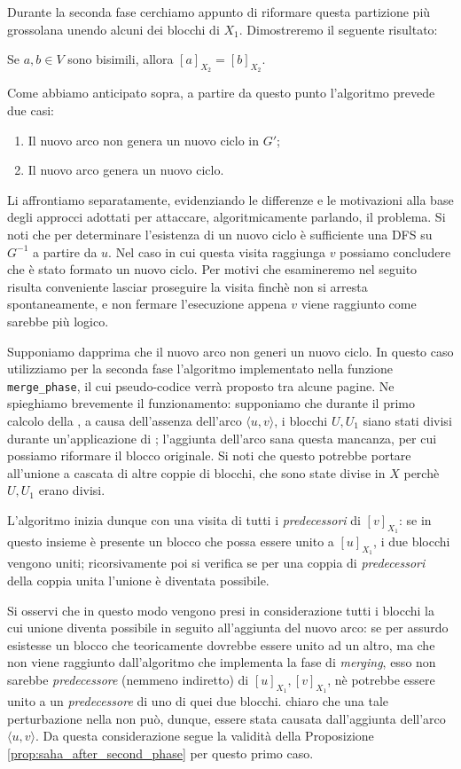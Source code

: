 Durante la seconda fase cerchiamo appunto di riformare questa partizione più grossolana unendo alcuni dei blocchi di $X_1$. Dimostreremo il seguente risultato:
\begin{proposition}
    \label{prop:saha_after_second_phase}
    Se $a,b \in V$ sono bisimili, allora $[a]_{X_2} = [b]_{X_2}$.
\end{proposition}

Come abbiamo anticipato sopra, a partire da questo punto l'algoritmo prevede due casi:
\begin{enumerate}
    \item Il nuovo arco non genera un nuovo ciclo in $G'$;
    \item Il nuovo arco genera un nuovo ciclo.
\end{enumerate}
Li affrontiamo separatamente, evidenziando le differenze e le motivazioni alla base degli approcci adottati per attaccare, algoritmicamente parlando, il problema. Si noti che per determinare l'esistenza di un nuovo ciclo è sufficiente una DFS su $G^{-1}$ a partire da $u$. Nel caso in cui questa visita raggiunga $v$ possiamo concludere che è stato formato un nuovo ciclo. Per motivi che esamineremo nel seguito risulta conveniente lasciar proseguire la visita finchè non si arresta spontaneamente, e non fermare l'esecuzione appena $v$ viene raggiunto come sarebbe più logico.

Supponiamo dapprima che il nuovo arco non generi un nuovo ciclo. In questo caso utilizziamo per la seconda fase l'algoritmo implementato nella funzione \texttt{merge\_phase}, il cui pseudo-codice verrà proposto tra alcune pagine. Ne spieghiamo brevemente il funzionamento: supponiamo che durante il primo calcolo della \rscp, a causa dell'assenza dell'arco $\langle u, v \rangle$, i blocchi $U,U_1$ siano stati divisi durante un'applicazione di \splitfunc; l'aggiunta dell'arco sana questa mancanza, per cui possiamo riformare il blocco originale. Si noti che questo potrebbe portare all'unione a cascata di altre coppie di blocchi, che sono state divise in $X$ perchè $U,U_1$ erano divisi.

L'algoritmo inizia dunque con una visita di tutti i \emph{predecessori} di $[v]_{X_1}$: se in questo insieme è presente un blocco che possa essere unito a $[u]_{X_1}$, i due blocchi vengono uniti; ricorsivamente poi si verifica se per una coppia di \emph{predecessori} della coppia unita l'unione è diventata possibile.

Si osservi che in questo modo vengono presi in considerazione tutti i blocchi la cui unione diventa possibile in seguito all'aggiunta del nuovo arco: se per assurdo esistesse un blocco che teoricamente dovrebbe essere unito ad un altro, ma che non viene raggiunto dall'algoritmo che implementa la fase di \emph{merging}, esso non sarebbe \emph{predecessore} (nemmeno indiretto) di $[u]_{X_1}, [v]_{X_1}$, nè potrebbe essere unito a un \emph{predecessore} di uno di quei due blocchi. \accente chiaro che una tale perturbazione nella \rscp non può, dunque, essere stata causata dall'aggiunta dell'arco $\langle u,v \rangle$. Da questa considerazione segue la validità della Proposizione \ref{prop:saha_after_second_phase} per questo primo caso.

